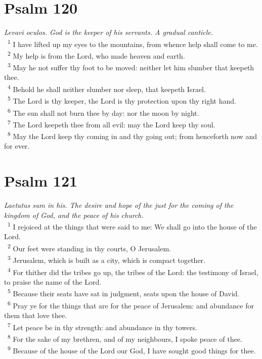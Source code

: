 \documentclass[a5paper,12pt]{article}
\begin{document}
\begin{multicols*}{2}
\section{Psalm 120}
\label{sec:orgd0987fb}
\emph{Levavi oculos. God is the keeper of his servants. A gradual canticle.}\\

~\textsuperscript{1} I have lifted up my eyes to the mountains, from whence help shall come to me.\\
~\textsuperscript{2} My help is from the Lord, who made heaven and earth.\\
~\textsuperscript{3} May he not suffer thy foot to be moved: neither let him slumber that keepeth thee.\\
~\textsuperscript{4} Behold he shall neither slumber nor sleep, that keepeth Israel.\\
~\textsuperscript{5} The Lord is thy keeper, the Lord is thy protection upon thy right hand.\\
~\textsuperscript{6} The sun shall not burn thee by day: nor the moon by night.\\
~\textsuperscript{7} The Lord keepeth thee from all evil: may the Lord keep thy soul.\\
~\textsuperscript{8} May the Lord keep thy coming in and thy going out; from henceforth now and for ever.\\

\section{Psalm 121}
\label{sec:org3ecfe3a}
\emph{Laetatus sum in his. The desire and hope of the just for the coming of the kingdom of God, and the peace of his church.}\\

~\textsuperscript{1} I rejoiced at the things that were said to me: We shall go into the house of the Lord.\\
~\textsuperscript{2} Our feet were standing in thy courts, O Jerusalem.\\
~\textsuperscript{3} Jerusalem, which is built as a city, which is compact together.\\
~\textsuperscript{4} For thither did the tribes go up, the tribes of the Lord: the testimony of Israel, to praise the name of the Lord.\\
~\textsuperscript{5} Because their seats have sat in judgment, seats upon the house of David.\\
~\textsuperscript{6} Pray ye for the things that are for the peace of Jerusalem: and abundance for them that love thee.\\
~\textsuperscript{7} Let peace be in thy strength: and abundance in thy towers.\\
~\textsuperscript{8} For the sake of my brethren, and of my neighbours, I spoke peace of thee.\\
~\textsuperscript{9} Because of the house of the Lord our God, I have sought good things for thee.\\


\end{multicols*}
\end{document}
